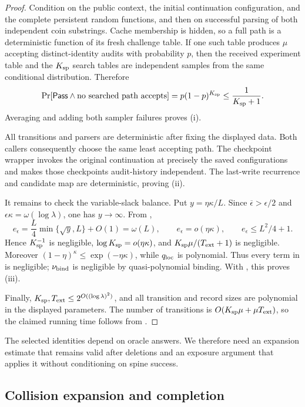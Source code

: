 \documentclass[11pt]{article}
\begin{document}
\begin{proof}
Condition on the public context, the initial continuation configuration, and
the complete persistent random functions, and then on successful parsing of
both independent coin substrings.  Cache membership is hidden, so a full path
is a deterministic function of its fresh challenge table.  If one such table
produces $\mu$ accepting distinct-identity audits with probability $p$, then
the received experiment table and the $K_{\rm sp}$ search tables are
independent samples from the same conditional distribution.  Therefore
\[
 \Pr[\mathsf{Pass}\wedge\text{no searched path accepts}]
 =p(1-p)^{K_{\rm sp}}\le\frac1{K_{\rm sp}+1}.
\]
Averaging and adding both sampler failures proves (i).

All transitions and parsers are deterministic after fixing the displayed
data.  Both callers consequently choose the same least accepting path.  The
checkpoint wrapper invokes the original continuation at precisely the saved
configurations and makes those checkpoints audit-history independent.  The
last-write recurrence and candidate map are deterministic, proving (ii).

It remains to check the variable-slack balance.  Put
$y=\eta\kappa/L$.  Since
$\overline\epsilon>\epsilon/2$ and
$\epsilon\kappa=\omega(\log\lambda)$, one has $y\to\infty$.  From
,
\[
 e_\epsilon=\frac L4\min\{\sqrt y,L\}+O(1)=\omega(L),
 \qquad e_\epsilon=o(\eta\kappa),
 \qquad e_\epsilon\le L^2/4+1.
\tag{19}\label{eq:spine-balance}
\]
Hence $K_{\rm sp}^{-1}$ is negligible,
$\log K_{\rm sp}=o(\eta\kappa)$, and
$K_{\rm sp}\mu/(T_{\rm ext}+1)$ is negligible.  Moreover
$(1-\eta)^\kappa\le\exp(-\eta\kappa)$, while
$q_{\rm loc}$ is polynomial.  Thus every term in  is
negligible; $\nu_{\rm bind}$ is negligible by quasi-polynomial binding.  With
, this proves (iii).

Finally, $K_{\rm sp},T_{\rm ext}\le2^{O((\log\lambda)^2)}$, and all transition
and record sizes are polynomial in the displayed parameters.  The number of
transitions is $O(K_{\rm sp}\mu+\mu T_{\rm ext})$, so the claimed running time
follows from .
\end{proof}

The selected identities depend on oracle answers.  We therefore need an
expansion estimate that remains valid after deletions and an exposure argument
that applies it without conditioning on spine success.

\subsection{Collision expansion and completion}
\end{document}
